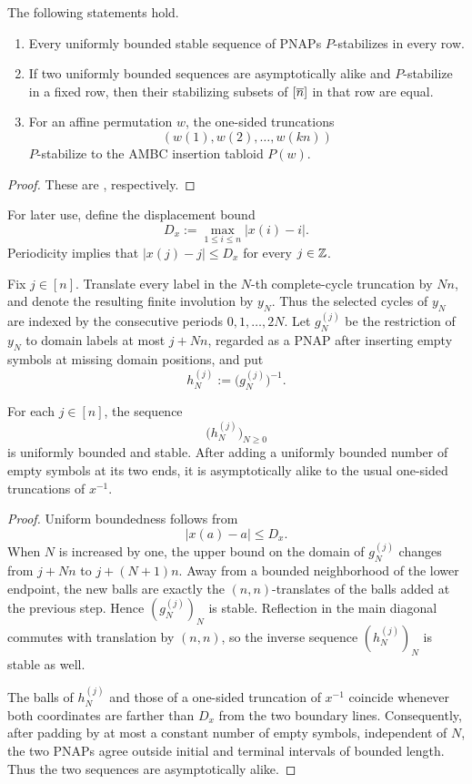 \documentclass[11pt]{article}
\begin{document}
\begin{proposition}
\label{pnap-stability-prop}
The following statements hold.
\begin{enumerate}
\item Every uniformly bounded stable sequence of PNAPs $P$-stabilizes in
      every row.
\item If two uniformly bounded sequences are asymptotically alike and
      $P$-stabilize in a fixed row, then their stabilizing subsets of
      $[\overline{n}]$ in that row are equal.
\item For an affine permutation $w$, the one-sided truncations
      \[
      (w(1),w(2),\ldots,w(kn))
      \]
      $P$-stabilize to the AMBC insertion tabloid $P(w)$.
\end{enumerate}
\end{proposition}

\begin{proof}
These are \cite[Lemma~12.4, Corollary~12.9, and
Theorem~7.3]{CPY}, respectively.
\end{proof}

For later use, define the displacement bound
\[
D_x:=\max_{1\leq i\leq n}|x(i)-i|.
\]
Periodicity implies that $|x(j)-j|\leq D_x$ for every $j\in\mathbb{Z}$.

Fix $j\in[n]$.  Translate every label in the $N$-th complete-cycle
truncation by $Nn$, and denote the resulting finite involution by $y_N$.
Thus the selected cycles of $y_N$ are indexed by the consecutive periods
$0,1,\ldots,2N$.  Let $g_N^{(j)}$ be the restriction of $y_N$ to domain
labels at most $j+Nn$, regarded as a PNAP after inserting empty symbols at
missing domain positions, and put
\[
h_N^{(j)}:=\bigl(g_N^{(j)}\bigr)^{-1}.
\]

\begin{lemma}
\label{complete-cycle-pnap-lem}
For each $j\in[n]$, the sequence
\[
\bigl(h_N^{(j)}\bigr)_{N\geq0}
\]
is uniformly bounded and stable.  After adding a uniformly bounded number
of empty symbols at its two ends, it is asymptotically alike to the usual
one-sided truncations of $x^{-1}$.
\end{lemma}

\begin{proof}
Uniform boundedness follows from
\[
|x(a)-a|\leq D_x.
\]
When $N$ is increased by one, the upper bound on the domain of
$g_N^{(j)}$ changes from $j+Nn$ to $j+(N+1)n$.  Away from a bounded
neighborhood of the lower endpoint, the new balls are exactly the
$(n,n)$-translates of the balls added at the previous step.  Hence
$(g_N^{(j)})_N$ is stable.  Reflection in the main diagonal commutes with
translation by $(n,n)$, so the inverse sequence $(h_N^{(j)})_N$ is stable
as well.

The balls of $h_N^{(j)}$ and those of a one-sided truncation of $x^{-1}$
coincide whenever both coordinates are farther than $D_x$ from the two
boundary lines.  Consequently, after padding by at most a constant number
of empty symbols, independent of $N$, the two PNAPs agree outside initial
and terminal intervals of bounded length.  Thus the two sequences are
asymptotically alike.
\end{proof}
\end{document}
